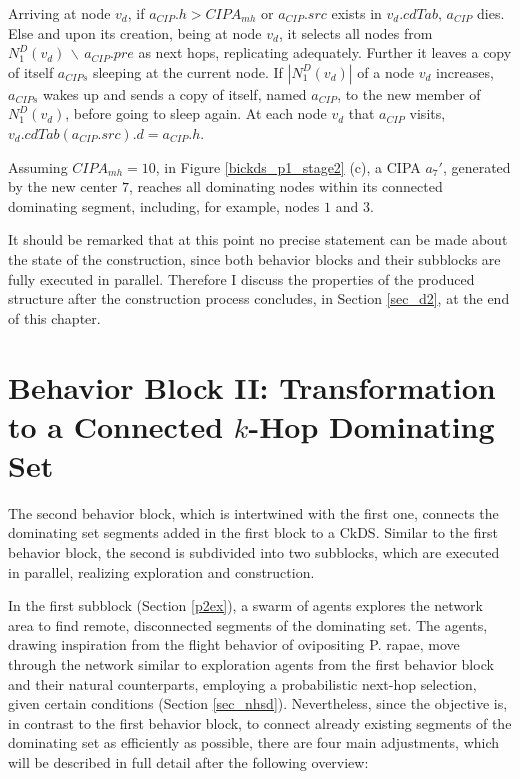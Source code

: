 Arriving at node $v_d$, if $a_{CIP}.h>CIPA_{mh}$ or $a_{CIP}.src$ exists in $v_d.cdTab$, $a_{CIP}$ dies. Else and upon its creation, being at node $v_d$, it selects all nodes from $N_1^D(v_d) \,\backslash\, a_{CIP}.pre$ as next hops, replicating adequately. Further it leaves a copy of itself $a_{CIPs}$ sleeping at the current node. If $|N_1^D(v_d)|$ of a node $v_d$ increases, $a_{CIPs}$ wakes up and sends a copy of itself, named $a_{CIP}$, to the new member of $N_1^D(v_d)$, before going to sleep again. At each node $v_d$ that $a_{CIP}$ visits, $v_d.cdTab(a_{CIP}.src).d=a_{CIP}.h$.


\exampleBegin Assuming $CIPA_{mh}=10$, in Figure \ref{bickds_p1_stage2} (c), a CIPA $a_7'$, generated by the new center $7$, reaches all dominating nodes within its connected dominating segment, including, for example, nodes $1$ and $3$.

\exampleEnd

It should be remarked that at this point no precise statement can be made about the state of the construction, since both behavior blocks and their subblocks are fully executed in parallel. Therefore I discuss the properties of the produced structure after the construction process concludes, in Section \ref{sec_d2}, at the end of this chapter.

\section{Behavior Block II: Transformation to a Connected $k$-Hop Dominating Set}\label{sb2}\label{sec_bbii2}

The second behavior block, which is intertwined with the first one, connects the dominating set segments added in the first block to a CkDS. Similar to the first behavior block, the second is subdivided into two subblocks, which are executed in parallel, realizing exploration and construction.

In the first subblock (Section \ref{p2ex}), a swarm of agents explores the network area to find remote, disconnected segments of the dominating set. The agents, drawing inspiration from the flight behavior of ovipositing P. rapae, move through the network similar to exploration agents from the first behavior block and their natural counterparts, employing a probabilistic next-hop selection, given certain conditions (Section \ref{sec_nhsd}). Nevertheless, since the objective is, in contrast to the first behavior block, to connect already existing segments of the dominating set as efficiently as possible, there are four main adjustments, which will be described in full detail after the following overview:

